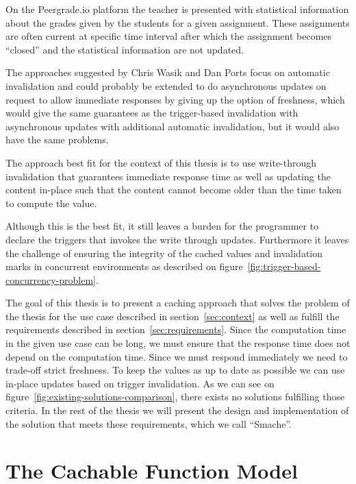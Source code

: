 \begin{example}
\label{example:assignment-computations}
On the Peergrade.io platform the teacher is presented with statistical information about the grades given by the students for a given assignment. These assignments are often current at specific time interval after which the assignment becomes ``closed'' and the statistical information are not updated.
\end{example}

The approaches suggested by Chris Wasik and Dan Ports focus on automatic invalidation and could probably be extended to do asynchronous updates on request to allow immediate responses by giving up the option of freshness, which would give the same guarantees as the trigger-based invalidation with asynchronous updates with additional automatic invalidation, but it would also have the same problems.

The approach best fit for the context of this thesis is to use write-through invalidation that guarantees immediate response time as well as updating the content in-place such that the content cannot become older than the time taken to compute the value.

Although this is the best fit, it still leaves a burden for the programmer to declare the triggers that invokes the write through updates. Furthermore it leaves the challenge of ensuring the integrity of the cached values and invalidation marks in concurrent environments as described on figure~\ref{fig:trigger-based-concurrency-problem}.

The goal of this thesis is to present a caching approach that solves the problem of the thesis for the use case described in section~\ref{sec:context} as well as fulfill the requirements described in section~\ref{sec:requirements}. Since the computation time in the given use case can be long, we must ensure that the response time does not depend on the computation time. Since we must respond immediately we need to trade-off strict freshness. To keep the values as up to date as possible we can use in-place updates based on trigger invalidation. As we can see on figure~\ref{fig:existing-solutions-comparison}, there exists no solutions fulfilling those criteria. In the rest of the thesis we will present the design and implementation of the solution that meets these requirements, which we call ``Smache''.


\section{The Cachable Function Model}
\label{sec:the_cachable_function_model}

